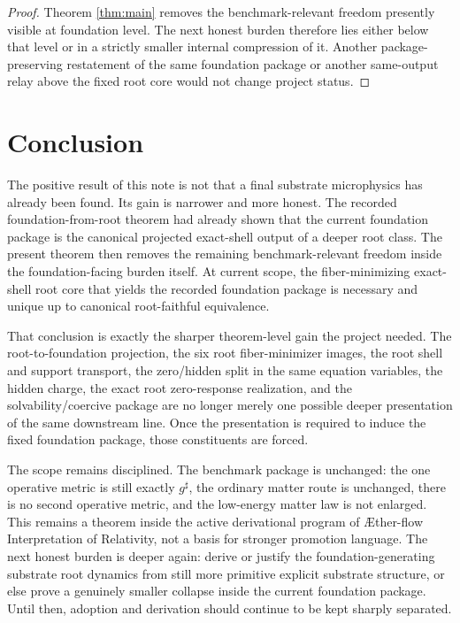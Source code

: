\documentclass[11pt]{article}
\newcommand{\Aflow}{\AE{}ther-flow}
\newcommand{\TheoryName}{\Aflow{} Interpretation of Relativity}
\newcommand{\CompletedMetric}{g^{\sharp}}
\begin{document}
\begin{proof}
Theorem \ref{thm:main} removes the benchmark-relevant freedom presently visible at foundation level. The next honest burden therefore lies either below that level or in a strictly smaller internal compression of it. Another package-preserving restatement of the same foundation package or another same-output relay above the fixed root core would not change project status.
\end{proof}

\section{Conclusion}

The positive result of this note is not that a final substrate microphysics has already been found. Its gain is narrower and more honest. The recorded foundation-from-root theorem had already shown that the current foundation package is the canonical projected exact-shell output of a deeper root class. The present theorem then removes the remaining benchmark-relevant freedom inside the foundation-facing burden itself. At current scope, the fiber-minimizing exact-shell root core that yields the recorded foundation package is necessary and unique up to canonical root-faithful equivalence.

That conclusion is exactly the sharper theorem-level gain the project needed. The root-to-foundation projection, the six root fiber-minimizer images, the root shell and support transport, the zero/hidden split in the same equation variables, the hidden charge, the exact root zero-response realization, and the solvability/coercive package are no longer merely one possible deeper presentation of the same downstream line. Once the presentation is required to induce the fixed foundation package, those constituents are forced.

The scope remains disciplined. The benchmark package is unchanged: the one operative metric is still exactly \(\CompletedMetric\), the ordinary matter route is unchanged, there is no second operative metric, and the low-energy matter law is not enlarged. This remains a theorem inside the active derivational program of \TheoryName{}, not a basis for stronger promotion language. The next honest burden is deeper again: derive or justify the foundation-generating substrate root dynamics from still more primitive explicit substrate structure, or else prove a genuinely smaller collapse inside the current foundation package. Until then, adoption and derivation should continue to be kept sharply separated.
\end{document}
